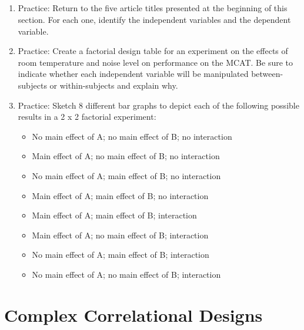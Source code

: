 \subsection{}
\begin{fullwidth}
\begin{enumerate}
\item  Practice: Return to the five article titles presented at the beginning of this section. For each one, identify the independent variables and the dependent variable.
\item Practice: Create a factorial design table for an experiment on the effects of room temperature and noise level on performance on the MCAT. Be sure to indicate whether each independent variable will be manipulated between-subjects or within-subjects and explain why.
\item Practice: Sketch 8 different bar graphs to depict each of the following possible results in a 2 x 2 factorial experiment:
\begin{itemize}
\item No main effect of A; no main effect of B; no interaction
\item Main effect of A; no main effect of B; no interaction
\item No main effect of A; main effect of B; no interaction
\item Main effect of A; main effect of B; no interaction
\item Main effect of A; main effect of B; interaction
\item Main effect of A; no main effect of B; interaction
\item No main effect of A; main effect of B; interaction
\item No main effect of A; no main effect of B; interaction
\end{itemize}
\end{enumerate}
\end{fullwidth}  

\newpage   



\section{Complex Correlational Designs}


